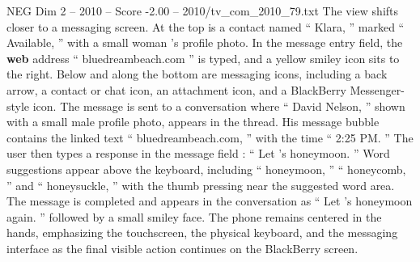 \begin{textsample}{NEG Dim 2 – 2010 – Score -2.00 – 2010/tv\_com\_2010\_79.txt}
The view shifts closer to a messaging screen.
At the top is a contact named “ Klara, ” marked “ Available, ” with a small woman ’s profile photo.
In the message entry field, the \textbf{web} address “ bluedreambeach.com ” is typed, and a yellow smiley icon sits to the right.
Below and along the bottom are messaging icons, including a back arrow, a contact or chat icon, an attachment icon, and a BlackBerry Messenger-style icon.
The message is sent to a conversation where “ David Nelson, ” shown with a small male profile photo, appears in the thread.
His message bubble contains the linked text “ bluedreambeach.com, ” with the time “ 2:25 PM. ” The user then types a response in the message field : “ Let ’s honeymoon. ” Word suggestions appear above the keyboard, including “ honeymoon, ” “ honeycomb, ” and “ honeysuckle, ” with the thumb pressing near the suggested word area.
The message is completed and appears in the conversation as “ Let ’s honeymoon again. ” followed by a small smiley face.
The phone remains centered in the hands, emphasizing the touchscreen, the physical keyboard, and the messaging interface as the final visible action continues on the BlackBerry screen.

\end{textsample}
